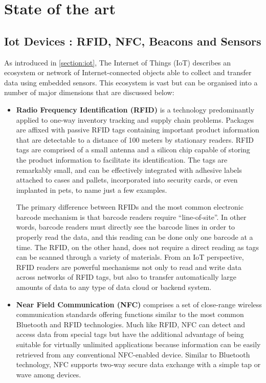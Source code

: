 \chead{}
\chapter{State of the art}

\section{Iot Devices : RFID, NFC, Beacons and Sensors}

As introduced in \ref{section:iot}, The Internet of Things (IoT) describes an ecosystem or network of Internet-connected objects able to collect and transfer data using embedded sensors. This ecosystem is vast but can be organised into a number of major dimensions that are discussed below: 

\begin{itemize}
  \item \textbf{Radio Frequency Identification (RFID) } is a technology predominantly applied to one-way inventory tracking and supply chain problems. Packages are affixed with passive RFID tags containing important product information that are detectable to a distance of 100 meters by stationary readers. RFID tags are comprised of a small antenna and a silicon chip capable of storing the product information to facilitate its identification. The tags are remarkably small, and can be effectively integrated with adhesive labels attached to cases and pallets, incorporated into security cards, or even implanted in pets, to name just a few examples.
  
  The primary difference between RFIDs and the most common electronic barcode mechanism is that barcode readers require ``line-of-site”. In other words, barcode readers must directly see the barcode lines in order to properly read the data, and this reading can be done only one barcode at a time. The RFID, on the other hand, does not require a direct reading as
tags can be scanned through a variety of materials. From an IoT perspective, RFID readers are powerful mechanisms not only to read and write data across networks of RFID tags, but also to transfer automatically large amounts of data to any type of data cloud or backend system.

  \item \textbf{Near Field Communication (NFC) } comprises a set of close-range wireless communication standards offering functions similar to the most common Bluetooth and RFID technologies. Much like RFID, NFC can detect and access data from special tags but have the additional advantage of being suitable for virtually unlimited applications because information can be easily retrieved from any conventional NFC-enabled device. Similar to Bluetooth technology, NFC supports two-way secure data exchange with a simple tap or wave among devices.
  

\end{itemize}
